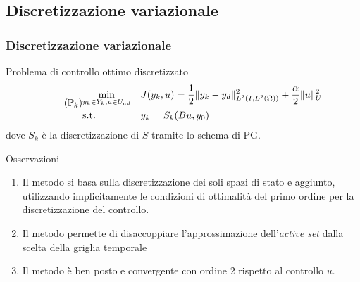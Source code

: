 \documentclass{beamer}
\theoremstyle{definition}
\theoremstyle{remark}
\theoremstyle{plain}
\theoremstyle{definition}
\DeclarePairedDelimiter{\norma}{\lVert}{\rVert}
\begin{document}
\subsection{Discretizzazione variazionale}
\begin{frame}
\frametitle{Discretizzazione variazionale}
Problema di controllo ottimo discretizzato
\begin{equation}
\tag{$\mathbb{P}_k$}
\begin{aligned}
& \underset{y_k \in Y_k, u \in U_{ad}}{\text{min}}
& & J(y_k,u) = \frac{1}{2}\norma{y_k-y_d}^2_{L^2(I,L^2(\Omega))} + \frac{\alpha}{2}\norma{u}^2_U \\
& \text{s.t.} & & y_k = S_k(Bu,y_0) 
\label{Pk}
\end{aligned}
\end{equation}
dove $ S_k $ è la discretizzazione di $ S $ tramite lo schema di PG.
\begin{block}{Osservazioni}
\begin{enumerate}[<+->]
\item Il metodo si basa sulla discretizzazione dei soli spazi di stato e aggiunto, utilizzando implicitamente le condizioni di ottimalità del primo ordine per la discretizzazione del controllo.
\item Il metodo permette di disaccoppiare l'approssimazione dell'\textit{active set} dalla scelta della griglia temporale
\item Il metodo è ben posto e convergente con ordine $ 2 $ rispetto al controllo $ u $.
\end{enumerate}
\end{block}
\end{frame}
\end{document}
